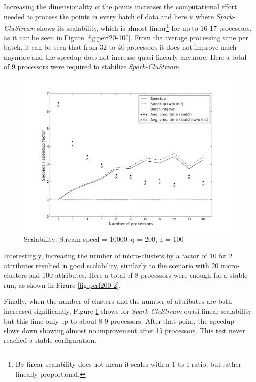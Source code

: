 Increasing the dimensionality of the points increases the computational effort needed to process the points in every batch of data and here is where \textit{Spark-CluStream} shows its scalability, which is almost linear\footnote{By linear scalability does not mean it scales with a 1 to 1 ratio, but rather linearly proportional.} for up to 16-17 processors, as it can be seen in Figure \ref{fig:perf20-100}.  From the average processing time per batch, it can be seen that from 32 to 40 processors it does not improve much anymore and the speedup does not increase quasi-linearly anymore. Here a total of 9 processors were required to stabilize \textit{Spark-CluStream}. 

\begin{figure}[h!]
 \centering
 \includegraphics[scale=0.4]{./styles/perf200-100.png}
 \caption{Scalability: Stream speed = 10000, q = 200, d = 100}
 \label{fig:perf200-100}
\end{figure}

Interestingly, increasing the number of micro-clusters by a factor of 10 for 2 attributes resulted in good scalability, similarly to the scenario with 20 micro-clusters and 100 attributes. Here a total of 8 processors were enough for a stable run, as shown in Figure \ref{fig:perf200-2}.



Finally, when the number of clusters and the number of attributes are both increased significantly, Figure \ref{fig:perf200-100} shows for \textit{Spark-CluStream} quasi-linear scalability but this time only up to about 8-9 processors. After that point, the speedup slows down showing almost no improvement after 16 processors. This test never reached a stable configuration.

